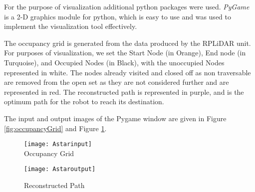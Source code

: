 For the purpose of visualization additional python packages were used. \emph{PyGame} is a 2-D graphics module for python, which is easy to use and was used to implement the visualization tool effectively. 

The occupancy grid is generated from the data produced by the RPLiDAR unit. For purposes of visualization, we set the Start Node (in Orange), End node (in Turquoise), and Occupied Nodes (in Black), with the unoccupied Nodes represented in white. The nodes already visited and closed off as non traversable are removed from the open set as they are not considered further and are represented in red. The reconstructed path is represented in purple, and is the optimum path for the robot to reach its destination.

The input and output images of the Pygame window are given in Figure \ref{fig:occupancyGrid} and Figure \ref{fig:reconstructedPath}.\\

\begin{figure}[H]
    \begin{multicols}{2}
    \centering
        \texttt{[image: Astarinput]}\\
        \caption{Occupancy Grid}
        \label{fig:occupancyGrid}

        \texttt{[image: Astaroutput]}\\
        \caption{Reconstructed Path}
        \label{fig:reconstructedPath}
    \end{multicols}
\end{figure}

